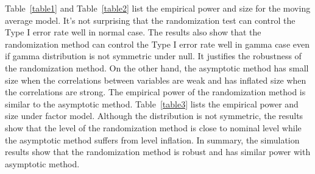\documentclass[3p]{elsarticle}
\theoremstyle{plain}
\theoremstyle{definition}
\theoremstyle{remark}
\begin{document}
Table~\ref{table1} and Table~\ref{table2} list the empirical power and size for the moving average model.
It's not surprising that the randomization test can  control the Type I error rate well in normal case.
The results also show that the randomization method can control the Type I error rate well in gamma case even if gamma distribution is not symmetric under null.
It justifies the robustness of the randomization method.
{\color{red}
On the other hand, the asymptotic method has small size when the correlations between variables are weak and has inflated size when the correlations are strong.
}
The empirical power of the randomization method is similar to the asymptotic method.
Table~\ref{table3} lists the empirical power and size under factor model.
Although the distribution is not symmetric, the results show that the level of the randomization method is close to nominal level while the asymptotic method suffers from level inflation.
In summary, the simulation results show that the randomization method is robust and has similar power with asymptotic method.
\end{document}
